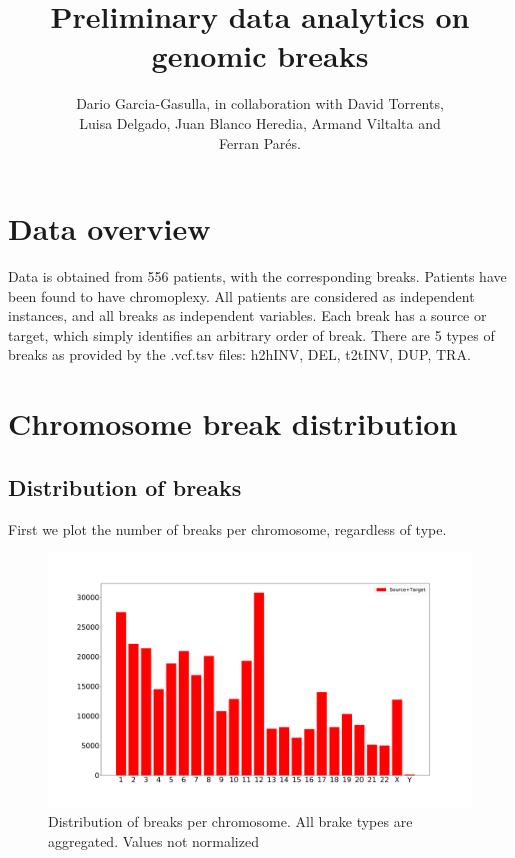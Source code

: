 \documentclass[a4paper,10pt]{article}
\title{Preliminary data analytics on genomic breaks}
\author{Dario Garcia-Gasulla, in collaboration with David Torrents,\\ Luisa Delgado, Juan Blanco Heredia, Armand Viltalta and \\Ferran Par\'{e}s. }
\begin{document}
\maketitle


\section*{Data overview}

Data is obtained from 556 patients, with the corresponding breaks. Patients have been found to have chromoplexy. All patients are considered as independent instances, and all breaks as independent variables. Each break has a source or target, which simply identifies an arbitrary order of break. There are 5 types of breaks as provided by the .vcf.tsv files: h2hINV, DEL, t2tINV, DUP, TRA.


\section*{Chromosome break distribution}

\subsection*{Distribution of breaks}

First we plot the number of breaks per chromosome, regardless of type.

\begin{figure}[H]
\includegraphics[scale=0.2]{figures/All_Break_distribution_unnormalized.pdf}
\caption{Distribution of breaks per chromosome. All brake types are aggregated. Values not normalized}
\end{figure}
\end{document}
